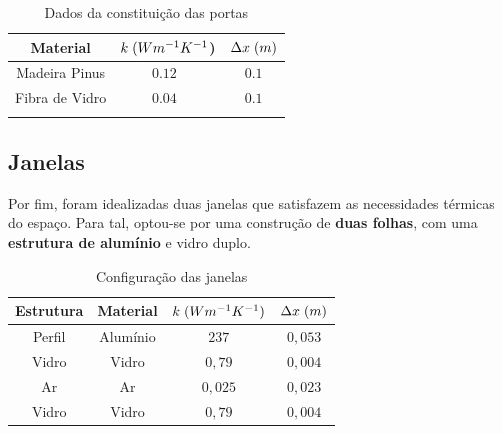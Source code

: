 \documentclass[12pt, a4paper]{article}
\begin{document}
\begin{table}[htpb]
    \begin{center}
        \begin{tabular}{c c c}
            \toprule{}
            Material & $ k \hspace{1mm} (Wm^{-1}K^{-1}$) & $ \Delta x \hspace{1mm} (m)$ \\
            \midrule{}
            Madeira Pinus & $0.12$~\cite{pine_wood} & $0.1$ \\
            \midrule{}
            Fibra de Vidro & $0.04$~\cite{glass_fiber} & $0.1$ \\
            \bottomrule{}
        \end{tabular}
    \end{center}
    \caption{Dados da constitui\c{c}\~ao das portas}\label{tab:portas}
\end{table}



\subsection{Janelas}\label{sub:Janelas}

Por fim, foram idealizadas duas janelas que satisfazem as necessidades térmicas do espaço.
Para tal, optou-se por uma construção de \textbf{duas folhas}, com uma \textbf{estrutura de alumínio} e
vidro duplo.

\begin{table}[htpb]
    \begin{center}
        \begin{tabular}{||c c c c||}
            \hline
            Estrutura & Material & $k \hspace{1mm} (Wm^{-1}K^{-1})$ & $\Delta x \hspace{1mm} (m)$ \\ [0.5ex]
            \hline\hline
            Perfil    & Alumínio & $237$                            & $0,053$                     \\
            \hline
            Vidro     & Vidro    & $0,79$                           & $0,004$                     \\
            \hline
            Ar        & Ar       & $0,025$                          & $0,023$                     \\
            \hline
            Vidro     & Vidro    & $0,79$                           & $0,004$                     \\
            \hline
        \end{tabular}
    \end{center}
    \caption{Configura\c{c}\~ao das janelas}
\end{table}
\end{document}
